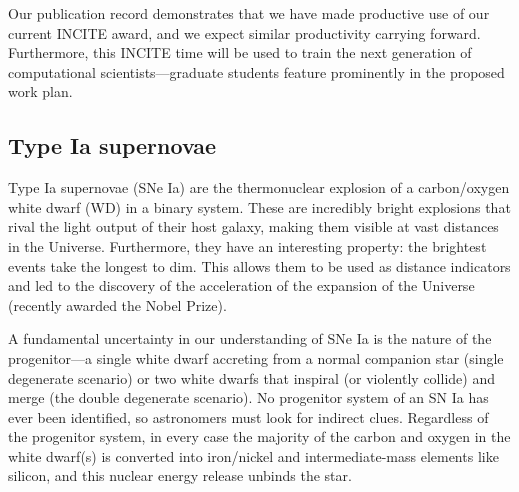 \documentclass[11pt,letterpaper,english]{article}
\begin{document}
Our publication record demonstrates that we have made productive use
of our current INCITE award, and we expect similar productivity
carrying forward.  Furthermore, this INCITE time will be used to train
the next generation of computational scientists---graduate students
feature prominently in the proposed work plan.


\subsection{Type Ia supernovae}

Type Ia supernovae (SNe Ia) are the thermonuclear explosion of a
carbon/oxygen white dwarf (WD) in a binary system.  These are incredibly
bright explosions that rival the light output of their host galaxy,
making them visible at vast distances in the Universe.  Furthermore,
they have an interesting property: the brightest events take the
longest to dim.  This allows them to be used as distance indicators
and led to the discovery of the acceleration of the expansion of the
Universe~\cite{Per99,Rie98} (recently awarded the Nobel Prize).

A fundamental uncertainty in our understanding of SNe Ia is the nature
of the progenitor---a single white dwarf accreting from a normal
companion star (single degenerate scenario) or two white dwarfs that
inspiral (or violently collide) and merge (the double degenerate
scenario).  No progenitor system of an SN Ia has ever been
identified, so astronomers must look for indirect clues.  Regardless
of the progenitor system, in every case the majority of the carbon and
oxygen in the white dwarf(s) is converted into iron/nickel and
intermediate-mass elements like silicon, and this nuclear energy
release unbinds the star.
\end{document}
